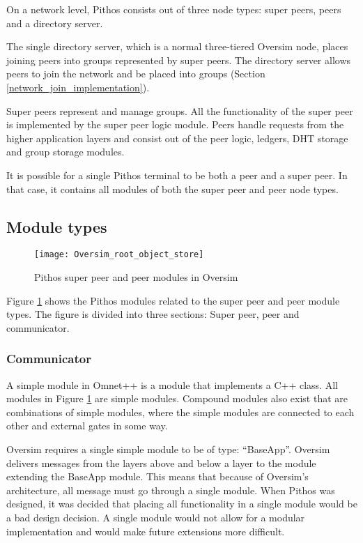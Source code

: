 On a network level, Pithos consists out of three node types: super peers, peers and a directory server.

The single directory server, which is a normal three-tiered Oversim node, places joining peers into groups represented by super peers. The directory server allows peers to join the network and be placed into groups (Section \ref{network_join_implementation}).

Super peers represent and manage groups. All the functionality of the super peer is implemented by the super peer logic module. Peers handle requests from the higher application layers and consist out of the peer logic, ledgers, DHT storage and group storage modules.

It is possible for a single Pithos terminal to be both a peer and a super peer. In that case, it contains all modules of both the super peer and peer node types.

\subsection{Module types}
\label{pithos_module_types}

\begin{figure}[htbp]
 \centering
 \texttt{[image: Oversim\_root\_object\_store]}
 \caption{Pithos super peer and peer modules in Oversim}
 \label{fig_oversim_root_object_store}
\end{figure}
%
Figure \ref{fig_oversim_root_object_store} shows the Pithos modules related to the super peer and peer module types. The figure is divided into three sections: Super peer, peer and communicator.

\subsubsection{Communicator}

A simple module in Omnet++ is a module that implements a C++ class. All modules in Figure \ref{fig_oversim_root_object_store} are simple modules. Compound modules also exist that are combinations of simple modules, where the simple modules are connected to each other and external gates in some way.

Oversim requires a single simple module to be of type: ``BaseApp''. Oversim delivers messages from the layers above and below a layer to the module extending the BaseApp module. This means that because of Oversim's architecture, all message must go through a single module. When Pithos was designed, it was decided that placing all functionality in a single module would be a bad design decision. A single module would not allow for a modular implementation and would make future extensions more difficult.

